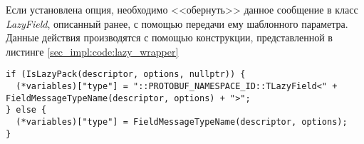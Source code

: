 Если установлена опция, необходимо <<обернуть>> данное сообщение в класс \textit{LazyField}, описанный ранее, с помощью передачи ему шаблонного параметра.
Данные действия производятся с помощью конструкции, представленной в листинге \ref{sec_impl:code:lazy_wrapper}

\begin{lstlisting}[style=CodeListing, label=sec_impl:code:lazy_wrapper, caption={Использование класса TLazyField в кодогенерации}]
if (IsLazyPack(descriptor, options, nullptr)) {
  (*variables)["type"] = "::PROTOBUF_NAMESPACE_ID::TLazyField<" + FieldMessageTypeName(descriptor, options) + ">";
} else {
  (*variables)["type"] = FieldMessageTypeName(descriptor, options);
}
\end{lstlisting}
